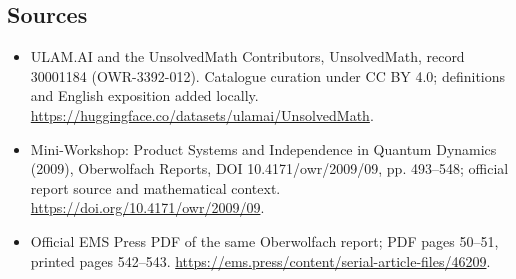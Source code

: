 \documentclass[11pt]{article}
\begin{document}
\subsection{Sources}
\begin{itemize}
\item[\hypertarget{source:30001184:1}{S1}] ULAM.AI and the UnsolvedMath Contributors, UnsolvedMath, record 30001184 (OWR-3392-012). Catalogue curation under CC BY 4.0; definitions and English exposition added locally.
\url{https://huggingface.co/datasets/ulamai/UnsolvedMath}.
\item[\hypertarget{source:30001184:2}{S2}] Mini-Workshop: Product Systems and Independence in Quantum Dynamics (2009), Oberwolfach Reports, DOI 10.4171/owr/2009/09, pp. 493--548; official report source and mathematical context.
\url{https://doi.org/10.4171/owr/2009/09}.
\item[\hypertarget{source:30001184:3}{S3}] Official EMS Press PDF of the same Oberwolfach report; PDF pages 50--51, printed pages 542--543.
\url{https://ems.press/content/serial-article-files/46209}.
\end{itemize}
\label{end:30001184}
\end{document}
